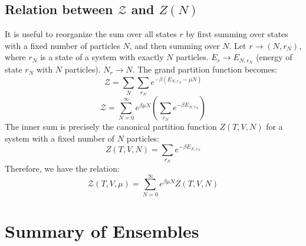 \documentclass[11pt]{article}
\newcommand{\grandpartfn}{\mathcal{Z}} %
\begin{document}
\subsection*{Relation between $\grandpartfn$ and $Z(N)$}
It is useful to reorganize the sum over all states $r$ by first summing over states with a fixed number of particles $N$, and then summing over $N$.
Let $r \to (N, r_N)$, where $r_N$ is a state of a system with exactly $N$ particles.
$E_r \to E_{N, r_N}$ (energy of state $r_N$ with $N$ particles).
$N_r \to N$.
The grand partition function becomes:
\[ \grandpartfn = \sum_N \sum_{r_N} e^{-\beta(E_{N, r_N} - \mu N)} \]
\[ \grandpartfn = \sum_{N=0}^\infty e^{\beta \mu N} \left( \sum_{r_N} e^{-\beta E_{N, r_N}} \right) \]
The inner sum is precisely the canonical partition function $Z(T, V, N)$ for a system with a fixed number of $N$ particles:
\[ Z(T, V, N) = \sum_{r_N} e^{-\beta E_{N, r_N}} \]
Therefore, we have the relation:
\[ \grandpartfn(T, V, \mu) = \sum_{N=0}^\infty e^{\beta \mu N} Z(T, V, N) \]

\section*{Summary of Ensembles}
\end{document}
